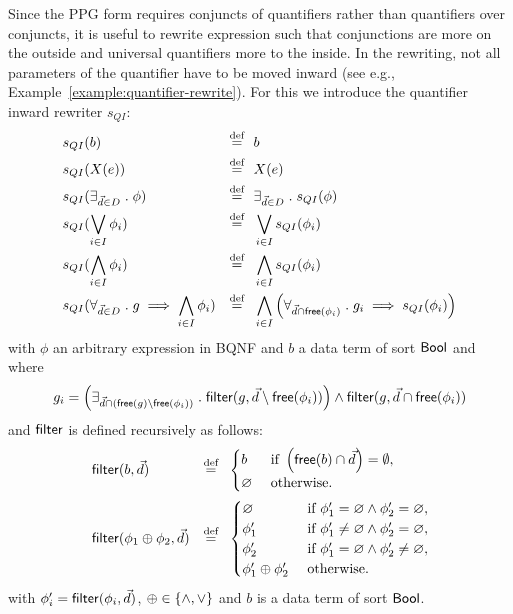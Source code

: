 \documentclass{article}
\begin{document}
Since the PPG form requires conjuncts of quantifiers rather than quantifiers over conjuncts, it is useful to rewrite expression such that conjunctions are more on the outside and universal quantifiers more to the inside. 
In the rewriting, not all parameters of the quantifier have to be moved inward (see e.g., Example~\ref{example:quantifier-rewrite}).
For this we introduce the quantifier inward rewriter $s_{QI}$:
\begin{align*}
& s_{QI}(b) & \mathrel{\displaystyle \mathop{=}^{\text{def}}}\ \  & b \\
& s_{QI}(X(e)) & \mathrel{\displaystyle \mathop{=}^{\text{def}}}\ \  & X(e) \\
& s_{QI}( \exists_{\vec{d} \in D} \mathrel{.} \phi ) & \mathrel{\displaystyle \mathop{=}^{\text{def}}}\ \  &
    \exists_{\vec{d} \in D} \mathrel{.} s_{QI}(\phi) \\
& s_{QI}( \bigvee_{i \in I} \phi_i ) & \mathrel{\displaystyle \mathop{=}^{\text{def}}}\ \  &
    \bigvee_{i \in I} s_{QI}(\phi_i) \\
& s_{QI}( \bigwedge_{i \in I} \phi_i ) & \mathrel{\displaystyle \mathop{=}^{\text{def}}}\ \  &
    \bigwedge_{i \in I} s_{QI}(\phi_i) \\
& s_{QI}( \forall_{\vec{d} \in D} \mathrel{.} g \implies \bigwedge_{i \in I} \phi_i ) & \mathrel{\displaystyle \mathop{=}^{\text{def}}}\ \  &
    \bigwedge_{i \in I} \left( \forall_{\vec{d} \cap \operatorname*{\mathsf{free}}(\phi_i)} \mathrel{.} g_i \implies s_{QI}(\phi_i) \right)
\end{align*}
with $\phi$ an arbitrary expression in BQNF and $b$ a data term of sort $\mathsf{Bool}$
and where 
\[
  g_i = \left( \exists_{\vec{d} \cap (\operatorname*{\mathsf{free}}(g) \setminus \operatorname*{\mathsf{free}}(\phi_i))} \mathrel{.} \operatorname*{\mathsf{filter}}(g, \vec{d} \setminus \operatorname*{\mathsf{free}}(\phi_i)) \right) \land \operatorname*{\mathsf{filter}}(g, \vec{d} \cap \operatorname*{\mathsf{free}}(\phi_i))
\]
and $\operatorname*{\mathsf{filter}}$ is defined recursively as follows:
\begin{align*}
& \operatorname*{\mathsf{filter}}(b, \vec{d})                    & \mathrel{\displaystyle \mathop{=}^{\text{def}}}\ \  &
  \begin{cases}
    b & \text{ if } \left(\operatorname*{\mathsf{free}}(b) \cap \vec{d}\right) = \emptyset, \\
    \varnothing & \text{ otherwise. }
  \end{cases}\\
& \operatorname*{\mathsf{filter}}(\phi_1 \oplus \phi_2, \vec{d}) & \mathrel{\displaystyle \mathop{=}^{\text{def}}}\ \  & 
  \begin{cases}
    \varnothing & \text{ if } \phi_1' = \varnothing \land \phi_2' = \varnothing, \\
    \phi_1' & \text{ if } \phi_1' \neq \varnothing \land \phi_2' = \varnothing, \\
    \phi_2' & \text{ if } \phi_1' = \varnothing \land \phi_2' \neq \varnothing, \\
    \phi_1' \oplus \phi_2' & \text{ otherwise. }
  \end{cases}\\
\end{align*}
with $\phi_i' = \operatorname*{\mathsf{filter}}(\phi_i, \vec{d})$, $\oplus \in \left\lbrace \land, \lor \right\rbrace$ and $b$ is a data term of sort $\mathsf{Bool}$.
\end{document}
